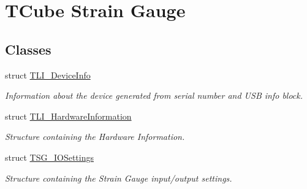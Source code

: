 \hypertarget{group___t_cube_strain_gauge}{}\section{T\+Cube Strain Gauge}
\label{group___t_cube_strain_gauge}
\subsection*{Classes}
\begin{DoxyCompactItemize}
\item 
struct \hyperlink{struct_t_l_i___device_info}{T\+L\+I\+\_\+\+Device\+Info}
\begin{DoxyCompactList}\small\item\em Information about the device generated from serial number and U\+SB info block. \end{DoxyCompactList}\item 
struct \hyperlink{struct_t_l_i___hardware_information}{T\+L\+I\+\_\+\+Hardware\+Information}
\begin{DoxyCompactList}\small\item\em Structure containing the Hardware Information. \end{DoxyCompactList}\item 
struct \hyperlink{struct_t_s_g___i_o_settings}{T\+S\+G\+\_\+\+I\+O\+Settings}
\begin{DoxyCompactList}\small\item\em Structure containing the Strain Gauge input/output settings. \end{DoxyCompactList}\end{DoxyCompactItemize}
